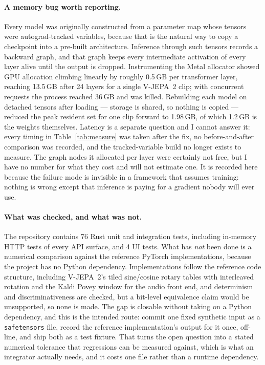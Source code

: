 \documentclass[11pt,onecolumn]{article}
\newcommand{\code}[1]{\texttt{#1}}
\begin{document}
\paragraph{A memory bug worth reporting.}
Every model was originally constructed from a parameter map whose tensors were
autograd-tracked variables, because that is the natural way to copy a checkpoint into a
pre-built architecture. Inference through such tensors records a backward graph, and that
graph keeps every intermediate activation of every layer alive until the output is
dropped. Instrumenting the Metal allocator showed GPU allocation climbing linearly by
roughly 0.5\,GB per transformer layer, reaching 13.5\,GB after 24 layers for a single
V-JEPA~2 clip; with concurrent requests the process reached 36\,GB and was killed.
Rebuilding each model on detached tensors after loading --- storage is shared, so nothing
is copied --- reduced the peak resident set for one clip forward to 1.98\,GB, of which
1.2\,GB is the weights themselves. Latency is a separate question and I cannot answer it:
every timing in Table~\ref{tab:measure} was taken after the fix, no before-and-after
comparison was recorded, and the tracked-variable build no longer exists to measure. The
graph nodes it allocated per layer were certainly not free, but I have no number for what
they cost and will not estimate one. It is recorded here because the failure mode is
invisible in a framework that assumes training: nothing is wrong except that inference is
paying for a gradient nobody will ever use.

\paragraph{What was checked, and what was not.}
The repository contains 76 Rust unit and integration tests, including in-memory HTTP tests
of every API surface, and 4 UI tests. What has \emph{not} been done is a numerical
comparison against the reference PyTorch implementations, because the project has no
Python dependency. Implementations follow the reference code structure, including
V-JEPA~2's tiled sine/cosine rotary tables with interleaved rotation and the Kaldi Povey
window for the audio front end, and determinism and discriminativeness are checked, but a
bit-level equivalence claim would be unsupported, so none is made. The gap is closable
without taking on a Python dependency, and this is the intended route: commit one fixed
synthetic input as a \code{safetensors} file, record the reference implementation's output
for it once, off-line, and ship both as a test fixture. That turns the open question into
a stated numerical tolerance that regressions can be measured against, which is what an
integrator actually needs, and it costs one file rather than a runtime dependency.
\end{document}

